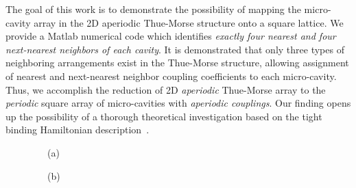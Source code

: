 The goal of this work is to demonstrate the possibility of mapping the micro-cavity array in the 2D aperiodic Thue-Morse structure onto a square lattice. We provide a Matlab numerical code which identifies {\it exactly four nearest and four next-nearest neighbors of each cavity}. It is demonstrated that only three types of neighboring arrangements exist in the Thue-Morse structure, allowing assignment of nearest and next-nearest neighbor coupling coefficients to each micro-cavity. Thus, we accomplish the reduction of 2D {\it aperiodic} Thue-Morse array to the {\it periodic} square array of micro-cavities with {\it aperiodic couplings}. Our finding opens up the possibility of a thorough theoretical investigation based on the tight binding Hamiltonian description~\cite{2009_Barber}.

\begin{figure}%
\begin{flushleft} 
\ \ \ (a)
\end{flushleft}
\vskip -0.3in
\begin{flushleft} 
\ \ \ (b)
\end{flushleft}
\vskip -0.2in

\end{figure}
